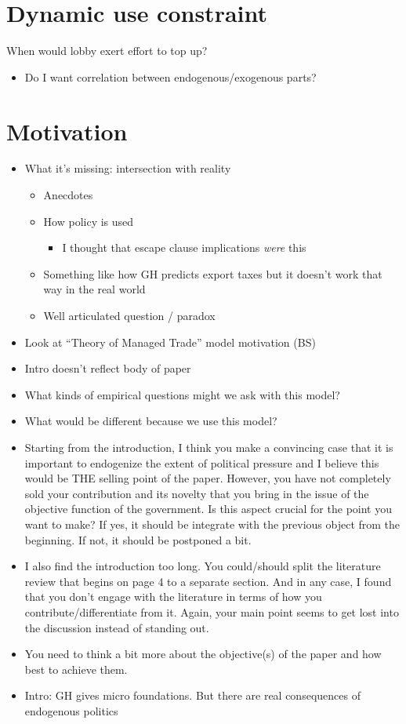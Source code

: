 \documentclass[12pt]{article}
\begin{document}
\section{Dynamic use constraint}
When would lobby exert effort to top up?
\begin{itemize}
	\item Do I want correlation between endogenous/exogenous parts? 
\end{itemize}


\section{Motivation}
		\begin{itemize}
			\item What it's missing: intersection with reality
				\begin{itemize}
					\item Anecdotes
					\item How policy is used
						\begin{itemize}
							\item I thought that escape clause implications \textit{were} this
						\end{itemize}
					\item Something like how GH predicts export taxes but it doesn't work that way in the real world
					\item Well articulated question / paradox
				\end{itemize}
			\item Look at ``Theory of Managed Trade'' model motivation (BS)
			\item Intro doesn't reflect body of paper
			\item What kinds of empirical questions might we ask with this model?
			\item What would be different because we use this model?
			\item Starting from the introduction, I think you make a convincing case that it is important to endogenize the extent of political pressure and I believe this would be THE selling point of the paper. However, you have not completely sold your contribution and its novelty that you bring in the issue of the objective function of the government. Is this aspect crucial for the point you want to make? If yes, it should be integrate with the previous object from the beginning. If not, it should be postponed a bit.
			\item I also find the introduction too long. You could/should split the literature review that begins on page 4 to a separate section. And in any case, I found that you don't engage with the literature in terms of how you contribute/differentiate from it. Again, your main point seems to get lost into the discussion instead of standing out.
			\item You need to think a bit more about the objective(s) of the paper and how best to achieve them.
			\item Intro: GH gives micro foundations. But there are real consequences of endogenous politics
		\end{itemize}
		
\end{document}
